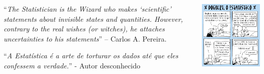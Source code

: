 \documentclass{beamer}
\begin{document}
\begin{frame}
  \begin{columns}
    \begin{column}{7cm}
      \begin{block}{}
        {\scriptsize ``{\em The Statistician is the Wizard who makes
            `scientific' statements about invisible states and
            quantities. However, contrary to the real wishes (or
            witches), he attaches uncertainties to his statements}'' –
          Carlos A.  Pereira.}
      \end{block}
      \begin{block}{}
        {\scriptsize ``{\em A Estatística é a arte de torturar os
            dados até que eles confessem a verdade.}'' - Autor
          desconhecido}
      \end{block}

    \end{column}
    \begin{column}{3cm}
      \begin{center}
        \includegraphics[width=1.6\textwidth]{Intro/dilbert}
      \end{center}
    \end{column}
  \end{columns}
\end{frame}
\end{document}
